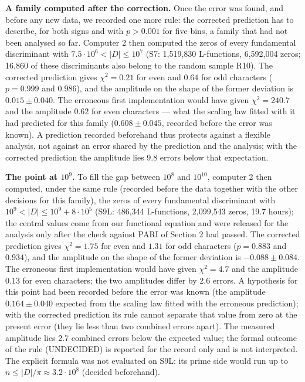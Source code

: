 \documentclass[
  10pt,
]{article}
\begin{document}
\textbf{A family computed after the correction.} Once the error was
found, and before any new data, we recorded one more rule: the corrected
prediction has to describe, for both signs and with \(p > 0.001\) for
five bins, a family that had not been analysed so far. Computer 2 then
computed the zeros of every fundamental discriminant with
\(7.5\cdot10^6 < |D| \le 10^7\) (S7: 1,519,830 L-functions, 6,592,004
zeros; 16,860 of these discriminants also belong to the random sample
R10). The corrected prediction gives \(\chi^2 = 0.21\) for even and
\(0.64\) for odd characters (\(p = 0.999\) and \(0.986\)), and the
amplitude on the shape of the former deviation is \(0.015 \pm 0.040\).
The erroneous first implementation would have given \(\chi^2 = 240.7\)
and the amplitude \(0.62\) for even characters --- what the scaling law
fitted with it had predicted for this family (\(0.608 \pm 0.045\),
recorded before the error was known). A prediction recorded beforehand
thus protects against a flexible analysis, not against an error shared
by the prediction and the analysis; with the corrected prediction the
amplitude lies 9.8 errors below that expectation.

\textbf{The point at \(10^9\).} To fill the gap between \(10^8\) and
\(10^{10}\), computer 2 then computed, under the same rule (recorded
before the data together with the other decisions for this family), the
zeros of every fundamental discriminant with
\(10^9 < |D| \le 10^9 + 8\cdot10^5\) (S9L: 486,344 L-functions,
2,099,543 zeros, 19.7 hours); the central values come from our
functional equation and were released for the analysis only after the
check against PARI of Section 2 had passed. The corrected prediction
gives \(\chi^2 = 1.75\) for even and \(1.31\) for odd characters
(\(p = 0.883\) and \(0.934\)), and the amplitude on the shape of the
former deviation is \(-0.088 \pm 0.084\). The erroneous first
implementation would have given \(\chi^2 = 4.7\) and the amplitude
\(0.13\) for even characters; the two amplitudes differ by 2.6 errors. A
hypothesis for this point had been recorded before the error was known
(the amplitude \(0.164 \pm 0.040\) expected from the scaling law fitted
with the erroneous prediction); with the corrected prediction its rule
cannot separate that value from zero at the present error (they lie less
than two combined errors apart). The measured amplitude lies 2.7
combined errors below the expected value; the formal outcome of the rule
(UNDECIDED) is reported for the record only and is not interpreted. The
explicit formula was not evaluated on S9L: its prime side would run up
to \(n \le |D|/\pi \approx 3.2\cdot10^8\) (decided beforehand).
\end{document}
